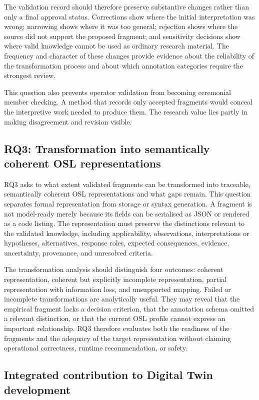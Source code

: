 The validation record should therefore preserve substantive changes rather than only a final approval status. Corrections show where the initial interpretation was wrong; narrowing shows where it was too general; rejection shows where the source did not support the proposed fragment; and sensitivity decisions show where valid knowledge cannot be used as ordinary research material. The frequency and character of these changes provide evidence about the reliability of the transformation process and about which annotation categories require the strongest review.

This question also prevents operator validation from becoming ceremonial member checking. A method that records only accepted fragments would conceal the interpretive work needed to produce them. The research value lies partly in making disagreement and revision visible.

\subsection{RQ3: Transformation into semantically coherent OSL representations}

RQ3 asks to what extent validated fragments can be transformed into traceable, semantically coherent OSL representations and what gaps remain. This question separates formal representation from storage or syntax generation. A fragment is not model-ready merely because its fields can be serialised as JSON or rendered as a code listing. The representation must preserve the distinctions relevant to the validated knowledge, including applicability, observations, interpretations or hypotheses, alternatives, response roles, expected consequences, evidence, uncertainty, provenance, and unresolved criteria.

The transformation analysis should distinguish four outcomes: coherent representation, coherent but explicitly incomplete representation, partial representation with information loss, and unsupported mapping. Failed or incomplete transformations are analytically useful. They may reveal that the empirical fragment lacks a decision criterion, that the annotation schema omitted a relevant distinction, or that the current OSL profile cannot express an important relationship. RQ3 therefore evaluates both the readiness of the fragments and the adequacy of the target representation without claiming operational correctness, runtime recommendation, or safety.

\subsection{Integrated contribution to Digital Twin development}

